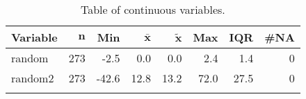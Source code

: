 {\footnotesize
\begin{longtable}{lrrrrrrr}
\caption{Table of continuous variables.} \\ 
 \textbf{Variable} & $\mathbf{n}$ & \textbf{Min} & $\mathbf{\bar{x}}$ & $\mathbf{\widetilde{x}}$ & \textbf{Max} & \textbf{IQR} & \textbf{\#NA} \\ 
  \hline
random & 273 &  -2.5 &  0.0 &  0.0 &  2.4 &  1.4 & 0 \\ 
  random2 & 273 & -42.6 & 12.8 & 13.2 & 72.0 & 27.5 & 0 \\ 
  \hline
\label{tab:table4}
\end{longtable}
}
